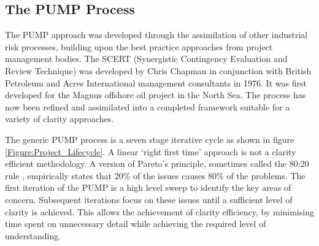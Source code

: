 \subsection{The PUMP Process}

The PUMP approach was developed through the assimilation of other industrial risk processes, building upon the best practice approaches from project management bodies.
The SCERT (Synergistic Contingency Evaluation and Review Technique) was developed by Chris Chapman in conjunction with British Petroleum and Acres International management consultants in 1976.
It was first developed for the Magnus offshore oil project in the North Sea. 
The process has now been refined and assimilated into a completed framework suitable for a variety of clarity approaches.

The generic PUMP process is a seven stage iterative cycle as shown in figure \ref{Figure:Project_Lifecycle}. 
A linear `right first time' approach is not a clarity efficient methodology.
A version of Pareto's principle, sometimes called the 80:20 rule \citep{Pareto1992}, empirically states that 20\% of the issues causes 80\% of the problems. 
The first iteration of the PUMP is a high level sweep to identify the key areas of concern.
Subsequent iterations focus on these issues until a sufficient level of clarity is achieved.
This allows the achievement of clarity efficiency, by minimising time spent on unnecessary detail while achieving the required level of understanding.

